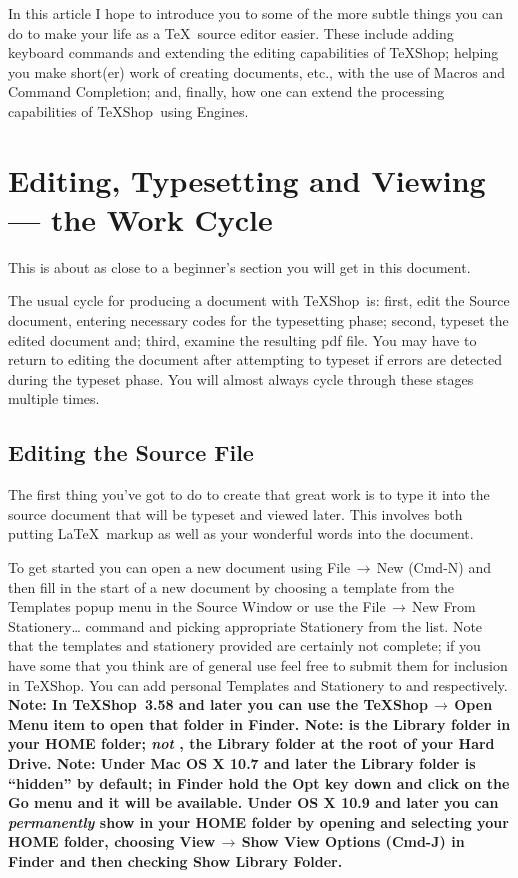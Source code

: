 \documentclass[letterpaper,11pt]{article}
\newcommand{\TS}{\textsf{\TeX Shop}}
\newcommand{\cmd}[1]{\textsf{#1}}
\newcommand{\mnu}[1]{\textsf{#1}}
\newcommand{\To}{\,\(\to\)\,}
\begin{document}
In this article I hope to introduce you to some of the more subtle things you can do to make your life as a \TeX\ source editor easier. These include adding keyboard commands and extending the editing capabilities of \TS; helping you make short(er) work of creating documents, etc., with the use of Macros and Command Completion; and, finally, how one can extend the processing capabilities of \TS\ using Engines.

\section{Editing, Typesetting and Viewing --- the Work Cycle}

This is about as close to a beginner's section you will get in this document.

The usual cycle for producing a document with \TS\ is: first, edit the Source document, entering necessary codes for the typesetting phase; second, typeset the edited document and; third, examine the resulting \cmd{pdf} file. You may have to return to editing the document after attempting to typeset if errors are detected during the typeset phase. You will almost always cycle through these stages multiple times.

\subsection{Editing the Source File}

The first thing you've got to do to create that great work is to type it into the source document that will be typeset and viewed later. This involves both putting \LaTeX\ markup as well as your wonderful words into the document.

To get started you can open a new document using \mnu{File}\To\mnu{New} (\cmd{Cmd-N}) and then fill in the start of a new document by choosing a template from the \mnu{Templates} popup menu in the Source Window or use the \mnu{File}\To\mnu{New From Stationery…} command and picking appropriate Stationery from the list. Note that the templates and stationery provided are certainly not complete; if you have some that you think are of general use feel free to submit them for inclusion in \TS. You can add personal Templates and Stationery to  and  respectively. \textbf{Note: In \TS\ 3.58 and later you can use the \mnu{TeXShop}\To\mnu{Open } Menu item to open that folder in Finder. Note:  is the \cmd{Library} folder in your \cmd{HOME} folder; \emph{not} , the \cmd{Library} folder at the \cmd{root} of your Hard Drive. Note: Under \textsf{Mac OS X 10.7 and later} the \cmd{Library} folder is ``hidden'' by default; in \cmd{Finder} hold the \cmd{Opt} key down and click on the \mnu{Go} menu and it will be available. Under \textsf{OS X 10.9 and later} you can \emph{permanently} show  in your \cmd{HOME} folder by opening and selecting your \cmd{HOME} folder, choosing \mnu{View}\To\mnu{Show View Options} (\cmd{Cmd-J}) in \cmd{Finder} and then checking \cmd{Show Library Folder}.}
\end{document}
